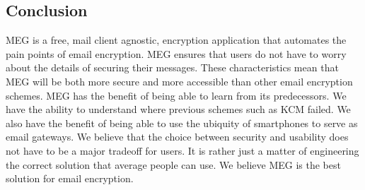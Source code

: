 \documentclass[10pt]{article}
\begin{document}
\begin{multicols}{2}
\section{Conclusion}
\par MEG is a free, mail client agnostic, encryption application that automates the pain points of email encryption. MEG ensures that users do not have to worry about the details of securing their messages. These characteristics mean that MEG will be both more secure and more accessible than other email encryption schemes. MEG has the benefit of being able to learn from its predecessors. We have the ability to understand where previous schemes such as KCM failed. We also have the benefit of being able to use the ubiquity of smartphones to serve as email gateways. We believe that the choice between security and usability does not have to be a major tradeoff for users. It is rather just a matter of engineering the correct solution that average people can use. We believe MEG is the best solution for email encryption.



\end{multicols}
\end{document}
